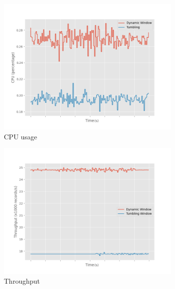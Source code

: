 \begin{figure}
    \begin{subfigure}[b]{0.5\columnwidth}
        \includegraphics[width=\columnwidth]{fig/periodic/cpu_comparison.png}
        \caption{CPU usage}
        \label{fig:periodic_cpu}
    \end{subfigure}
    \hfill 
    \begin{subfigure}[b]{0.5\columnwidth}
        \includegraphics[width=\columnwidth]{fig/periodic/throughput_comparison.png}
        \caption{Throughput }
        \label{fig:periodic_throughput}
    \end{subfigure}
    \begin{subfigure}[b]{0.5\columnwidth}

\end{subfigure}
\end{figure}
